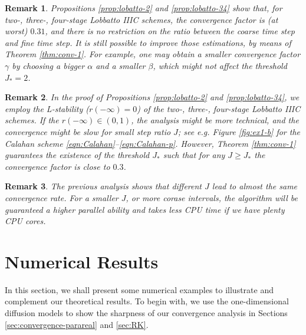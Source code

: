 \documentclass[a4paper, oneside]{book}
\newtheorem{remark}{Remark}[section]
\begin{document}
\begin{remark}
Propositions \ref{prop:lobatto-2} and \ref{prop:lobatto-34} show that, for two-, three-, four-stage Lobbatto IIIC schemes, the convergence factor is (at worst) $0.31$,
and there is no restriction
on the ratio between the coarse time step and fine
time step.
It is still possible to improve those estimations, by means of Theorem \ref{thm:conv-1}.
For example, one may obtain a smaller
convergence factor $\gamma$ by choosing a bigger $\alpha$ and
a smaller $\beta$, which might not affect the threshold $J_*=2$.
\end{remark}

\begin{remark}\label{rem:calahan}
In the proof of Propositions \ref{prop:lobatto-2} and \ref{prop:lobatto-34}, we employ the \textsl{L-stability} ($r(-\infty) = 0$) of the two-, three-, four-stage Lobbatto IIIC schemes. If the $r(-\infty) \in (0,1)$,
the analysis might be more technical, and the convergence might be
slow for small step ratio $J$; see e.g. Figure \ref{fig:ex1-b} for the Calahan scheme \eqref{eqn:Calahan}--\eqref{eqn:Calahan-p}.
However, Theorem \ref{thm:conv-1} guarantees the existence of the
threshold $J_*$ such that for any $J\ge J_*$ the convergence factor is close to $0.3$.
\end{remark}

{
\begin{remark}
The previous analysis shows that different $J$ lead to almost the same convergence rate. For a smaller $J$, or more corase intervals, the algorithm will be guaranteed a higher parallel ability and takes less CPU time if we have plenty CPU cores. 
\end{remark}}

\section{Numerical Results}\label{sec:parareal-numerical}
In this section, we shall present some numerical examples to illustrate and complement our theoretical results.
To begin with, we use the one-dimensional diffusion models to show the sharpness of our convergence analysis in Sections \ref{sec:convergence-parareal} and \ref{sec:RK}.
\end{document}
